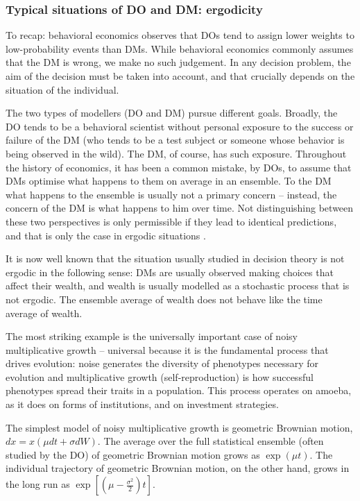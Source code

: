 \documentclass[a4paper, 12pt]{article}
\begin{document}
\FloatBarrier
\subsubsection{Typical situations of DO and DM: ergodicity}
To recap: behavioral economics observes that DOs tend to assign lower weights to low-probability events than DMs.
While behavioral economics commonly assumes that the DM is wrong, we make no such judgement. In any decision problem, the aim of the decision must be taken into account, and that crucially depends on the situation of the individual. 

The two types of modellers (DO and DM) pursue different goals. Broadly, the DO tends to be a behavioral scientist without personal exposure to the success or failure of the DM (who tends to be a test subject or someone whose behavior is being observed in the wild). The DM, of course, has such exposure. Throughout the history of economics, it has been a common mistake, by DOs, to assume that DMs optimise what happens to them on average in an ensemble. To the DM what happens to the ensemble is usually not a primary concern -- instead, the concern of the DM is what happens to him over time. Not distinguishing between these two perspectives is only permissible if they lead to identical predictions, and that is only the case in ergodic situations \citep{Peters2019b}. 

It is now well known that the situation usually studied in decision theory is not ergodic in the following sense: DMs are usually observed making choices that affect their wealth, and wealth is usually modelled as a stochastic process that is not ergodic. The ensemble average of wealth does not behave like the time average of wealth.

The most striking example is the universally important case of noisy multiplicative growth -- universal because it is the fundamental process that drives evolution: noise generates the diversity of phenotypes necessary for evolution and multiplicative growth (self-reproduction) is how successful phenotypes spread their traits in a population. This process operates on amoeba, as it does on forms of institutions, and on investment strategies.

The simplest model of noisy multiplicative growth is geometric Brownian motion, $dx=x(\mu dt+\sigma dW)$. The average over the full statistical ensemble (often studied by the DO) of geometric Brownian motion grows as $\exp(\mu t)$. The individual trajectory of geometric Brownian motion, on the other hand, grows in the long run as $\exp[(\mu-\frac{\sigma^2}{2})t]$.
\end{document}

